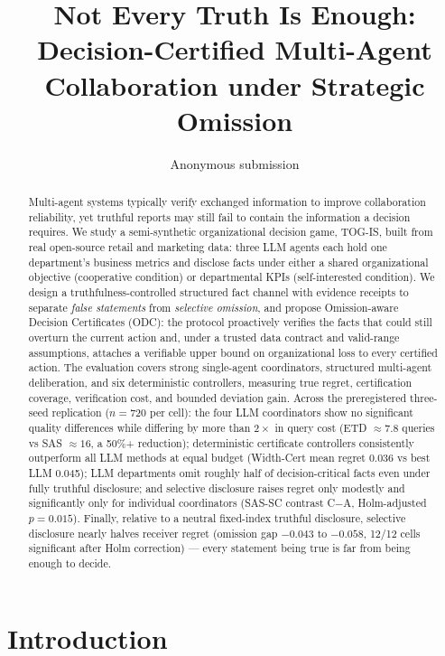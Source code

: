\documentclass[letterpaper]{article}
\title{Not Every Truth Is Enough: Decision-Certified Multi-Agent Collaboration under Strategic Omission}
\author{Anonymous submission}
\date{}
\begin{document}
\maketitle

\begin{abstract}
Multi-agent systems typically verify exchanged information to improve collaboration reliability, yet truthful reports may still fail to contain the information a decision requires. We study a semi-synthetic organizational decision game, TOG-IS, built from real open-source retail and marketing data: three LLM agents each hold one department's business metrics and disclose facts under either a shared organizational objective (cooperative condition) or departmental KPIs (self-interested condition). We design a truthfulness-controlled structured fact channel with evidence receipts to separate \emph{false statements} from \emph{selective omission}, and propose Omission-aware Decision Certificates (ODC): the protocol proactively verifies the facts that could still overturn the current action and, under a trusted data contract and valid-range assumptions, attaches a verifiable upper bound on organizational loss to every certified action. The evaluation covers strong single-agent coordinators, structured multi-agent deliberation, and six deterministic controllers, measuring true regret, certification coverage, verification cost, and bounded deviation gain. Across the preregistered three-seed replication ($n{=}720$ per cell): the four LLM coordinators show no significant quality differences while differing by more than $2\times$ in query cost (ETD ${\approx}7.8$ queries vs SAS ${\approx}16$, a 50\%+ reduction); deterministic certificate controllers consistently outperform all LLM methods at equal budget (Width-Cert mean regret 0.036 vs best LLM 0.045); LLM departments omit roughly half of decision-critical facts even under fully truthful disclosure; and selective disclosure raises regret only modestly and significantly only for individual coordinators (SAS-SC contrast C$-$A, Holm-adjusted $p{=}0.015$). Finally, relative to a neutral fixed-index truthful disclosure, selective disclosure nearly halves receiver regret (omission gap $-0.043$ to $-0.058$, 12/12 cells significant after Holm correction) --- every statement being true is far from being enough to decide.
\end{abstract}

\section{Introduction}
\end{document}
